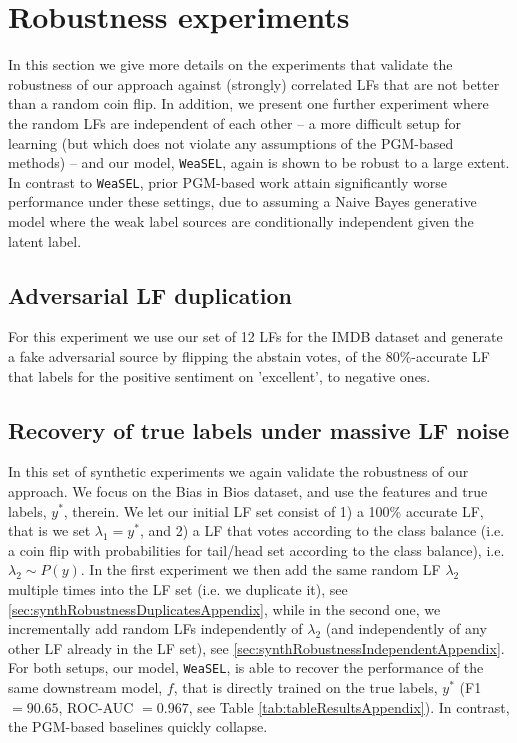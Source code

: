 \documentclass{article}
\newcommand{\weasel}{\texttt{WeaSEL}}\newcommand{\brackets}[1]{\left( #1 \right)}
\begin{document}
\section{Robustness experiments}
\label{sec:robustnessAppendix}
In this section we give more details on the experiments that validate the robustness of our approach against (strongly) correlated LFs that are not better than a random coin flip. In addition, we present one further experiment where the random LFs are independent of each other -- a more difficult setup for learning (but which does not violate any assumptions of the PGM-based methods) -- and our model, \weasel, again is shown to be robust to a large extent.
\\
In contrast to \weasel, prior PGM-based work \cite{Snorkel, triplets, TripletsMean} attain significantly worse performance under these settings, due to assuming a Naive Bayes generative model where the weak label sources are conditionally independent given the latent label.
\subsection{Adversarial LF duplication}
\label{sec:advRobustnessAppendix}
For this experiment we use our set of 12 LFs for the IMDB dataset and generate a fake adversarial source by flipping the abstain votes, of the 80\%-accurate LF that labels for the positive sentiment on 'excellent', to negative ones.
\subsection{Recovery of true labels under massive LF noise}
\label{sec:synthRobustnessAppendix}
In this set of synthetic experiments we again validate the robustness of our approach. We focus on the Bias in Bios dataset, and use the features and true labels, $y^*$, therein. We let our initial LF set consist of 1) a 100\% accurate LF, that is we set $\lambda_1 = y^*$, and 2) a LF that votes according to the class balance (i.e. a coin flip with probabilities for tail/head set according to the class balance), i.e. $\lambda_2 \sim P(y)$.
In the first experiment we then add the same random LF $\lambda_2$ multiple times into the LF set (i.e. we duplicate it), see \ref{sec:synthRobustnessDuplicatesAppendix}, while in the second one, we incrementally add random LFs independently of $\lambda_2$ (and independently of any other LF already in the LF set), see \ref{sec:synthRobustnessIndependentAppendix}.
For both setups, our model, \weasel, is able to recover the performance of the same downstream model, $f$, that is directly trained on the true labels, $y^*$ (F1 $= 90.65$, ROC-AUC $=0.967$, see Table \ref{tab:tableResultsAppendix}).
In contrast, the PGM-based baselines quickly collapse.
\end{document}
